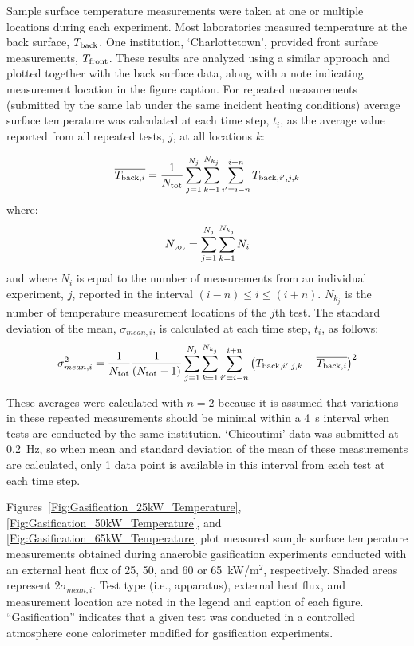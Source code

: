 \documentclass{book}
\begin{document}
Sample surface temperature measurements were taken at one or multiple locations during each experiment. Most laboratories measured temperature at the back surface, $T_{\rm back}$. One institution, ‘Charlottetown’, provided front surface measurements, $T_{\rm front}$. These results are analyzed using a similar approach and plotted together with the back surface data, along with a note indicating measurement location in the figure caption. For repeated measurements (submitted by the same lab under the same incident heating conditions) average surface temperature was calculated at each time step, $t_i$, as the average value reported from all repeated tests, $j$, at all locations $k$:

\begin{equation}
  \overline{ T_{{\rm back},i} } = \frac{1}{N_{\rm tot}} \sum_{j=1}^{N_j} \sum_{k=1}^{N_{k_j}} \sum_{i'=i-n}^{i+n} T_{{\rm back},i',j,k} 
\end{equation}
where:
\begin{equation}
N_{\rm tot}={\sum_{j=1}^{N_j}\sum_{k=1}^{N_{k_j}}N_i}
\end{equation}
and where $N_i$ is equal to the number of measurements from an individual experiment, $j$, reported in the interval $(i-n) \leq i \leq (i+n)$. $N_{k_j}$ is the number of temperature measurement locations of the $j$th test. The standard deviation of the mean, $\sigma_{mean,i}$, is calculated at each time step, $t_i$, as follows:
\begin{equation}
   \sigma_{mean,i}^2 = \frac{1}{N_{\rm tot}} \frac{1}{(N_{\rm tot}-1)}
    \sum_{j=1}^{N_j} \sum_{k=1}^{N_{k_j}} \sum_{i'=i-n}^{i+n} \left( T_{{\rm back},i',j,k} - \overline{ T_{{\rm back},i} }  \right)^2
\end{equation}


These averages were calculated with $n=2$ because it is assumed that variations in these repeated measurements should be minimal within a 4~s interval when tests are conducted by the same institution. ‘Chicoutimi’ data was submitted at 0.2~Hz, so when mean and standard deviation of the mean of these measurements are calculated, only 1 data point is available in this interval from each test at each time step.

Figures~\ref{Fig:Gasification_25kW_Temperature}, \ref{Fig:Gasification_50kW_Temperature}, and \ref{Fig:Gasification_65kW_Temperature} plot measured sample surface temperature measurements obtained during anaerobic gasification experiments conducted with an external heat flux of 25, 50, and 60 or 65~kW/m$^2$, respectively. Shaded areas represent $2\sigma_{mean,i}$. Test type (i.e., apparatus), external heat flux, and measurement location are noted in the legend and caption of each figure. ``Gasification'' indicates that a given test was conducted in a controlled atmosphere cone calorimeter modified for gasification experiments.
\end{document}
